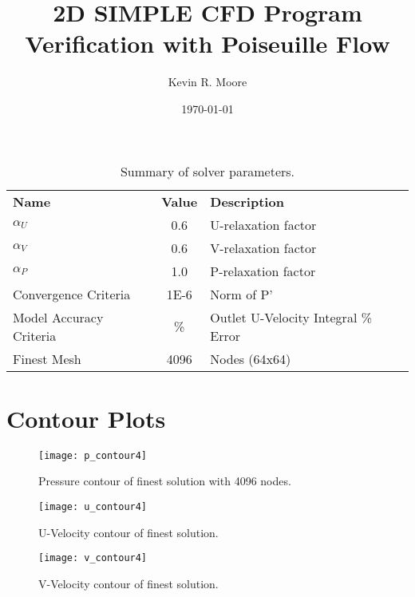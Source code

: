 \documentclass[10pt,english]{article}
\title{\vspace{-20pt}2D SIMPLE CFD Program Verification with Poiseuille Flow}
\author{Kevin R. Moore}
\affil{\vspace{-10pt}Brigham Young University}
\date{\today}
\begin{document}
\maketitle
\vspace{-30pt}

\begin{table*}[h]
\vspace{20pt}
\centering
  \begin{tabular}{lcl}
    \textbf{Name} & \textbf{Value} & \textbf{Description}  \\
    $\alpha_{U}$ & 0.6 & U-relaxation factor  \\
    $\alpha_{V}$ & 0.6 & V-relaxation factor  \\
    $\alpha_{P}$ & 1.0 & P-relaxation factor  \\
    Convergence Criteria  & 1E-6 & Norm of P' \\
    Model Accuracy Criteria  & \% & Outlet U-Velocity Integral \% Error  \\
    Finest Mesh  & 4096 & Nodes (64x64) \\

  \end{tabular}
  \caption{Summary of solver parameters.}
  \label{tab:params}
\end{table*}

\vspace{0pt}

\section{Contour Plots}

\begin{figure}[htbp]
\centering
\texttt{[image: p\_contour4]}
\vspace{-5pt}
\caption{Pressure contour of finest solution with 4096 nodes.}
\label{f:3b}
\end{figure}

\begin{figure}[htbp]
\centering
\texttt{[image: u\_contour4]}
\vspace{-5pt}
\caption{U-Velocity contour of finest solution.}
\label{f:3b}
\end{figure}

\begin{figure}[htbp]
\centering
\texttt{[image: v\_contour4]}
\vspace{-5pt}
\caption{V-Velocity contour of finest solution.}
\label{f:3b}
\end{figure}
\end{document}
